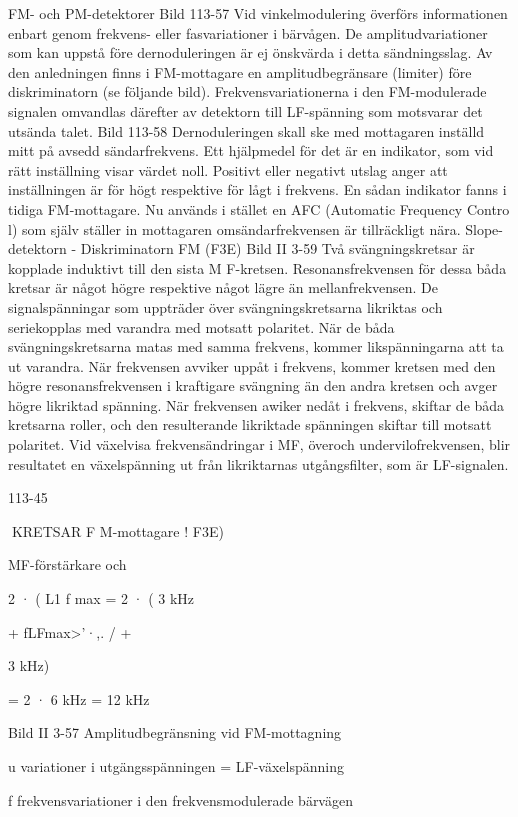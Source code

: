 {{{FM- och PM-detektorer
Bild 113-57
Vid vinkelmodulering överförs informationen
enbart genom frekvens- eller fasvariationer
i bärvågen. De amplitudvariationer som kan
uppstå före dernoduleringen är ej önskvärda
i detta sändningsslag. Av den anledningen
finns i FM-mottagare en amplitudbegränsare (limiter) före diskriminatorn (se följande
bild). Frekvensvariationerna i den FM-modulerade signalen omvandlas därefter av
detektorn till LF-spänning som motsvarar
det utsända talet.
Bild 113-58
Dernoduleringen skall ske med mottagaren inställd mitt på avsedd sändarfrekvens.
Ett hjälpmedel för det är en indikator, som vid
rätt inställning visar värdet noll. Positivt eller
negativt utslag anger att inställningen är för
högt respektive för lågt i frekvens. En sådan
indikator fanns i tidiga FM-mottagare. Nu
används i stället en AFC (Automatic Frequency Contro l) som själv ställer in mottagaren omsändarfrekvensen är tillräckligt nära.
Slope-detektorn - Diskriminatorn FM (F3E)
Bild II 3-59
Två svängningskretsar är kopplade induktivt
till den sista M F-kretsen. Resonansfrekvensen för dessa båda kretsar är något högre
respektive något lägre än mellanfrekvensen. De signalspänningar som uppträder
över svängningskretsarna likriktas och seriekopplas med varandra med motsatt polaritet.
När de båda svängningskretsarna matas
med samma frekvens, kommer likspänningarna att ta ut varandra. När frekvensen avviker uppåt i frekvens, kommer kretsen med
den högre resonansfrekvensen i kraftigare
svängning än den andra kretsen och avger
högre likriktad spänning. När frekvensen
awiker nedåt i frekvens, skiftar de båda
kretsarna roller, och den resulterande likriktade spänningen skiftar till motsatt polaritet.
Vid växelvisa frekvensändringar i MF,
överoch undervilofrekvensen, blir resultatet
en växelspänning ut från likriktarnas utgångsfilter, som är LF-signalen.

113-45

KRETSAR
F M-mottagare ! F3E)

MF-förstärkare och

2 · ( L1 f max
= 2 · ( 3 kHz

+ fLFmax>'·,.      /
+

3 kHz)

= 2 · 6 kHz = 12 kHz

Bild II 3-57 Amplitudbegränsning vid FM-mottagning

u
variationer i utgängsspänningen =
LF-växelspänning

f
frekvensvariationer i
den frekvensmodulerade bärvägen

}}}
